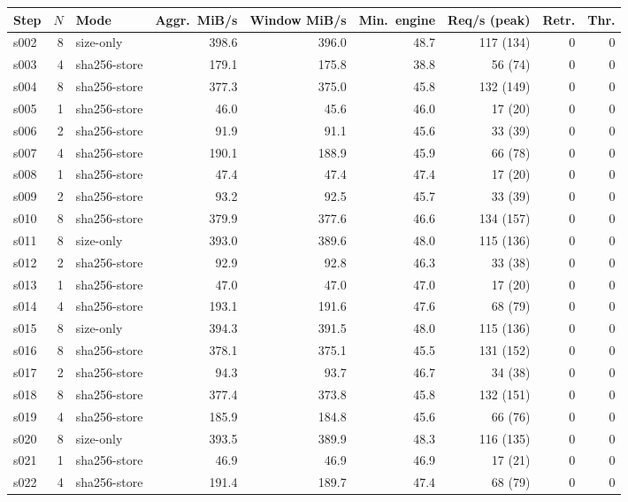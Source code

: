 
\begin{tabular}{@{}lrlrrrrrr@{}}
\toprule
Step & $N$ & Mode & Aggr.\ MiB/s & Window MiB/s & Min.\ engine & Req/s (peak) & Retr. & Thr. \\
\midrule
s002 & 8 & size-only & 398.6 & 396.0 & 48.7 & 117 (134) & 0 & 0 \\
s003 & 4 & sha256-store & 179.1 & 175.8 & 38.8 & 56 (74) & 0 & 0 \\
s004 & 8 & sha256-store & 377.3 & 375.0 & 45.8 & 132 (149) & 0 & 0 \\
s005 & 1 & sha256-store & 46.0 & 45.6 & 46.0 & 17 (20) & 0 & 0 \\
s006 & 2 & sha256-store & 91.9 & 91.1 & 45.6 & 33 (39) & 0 & 0 \\
s007 & 4 & sha256-store & 190.1 & 188.9 & 45.9 & 66 (78) & 0 & 0 \\
s008 & 1 & sha256-store & 47.4 & 47.4 & 47.4 & 17 (20) & 0 & 0 \\
s009 & 2 & sha256-store & 93.2 & 92.5 & 45.7 & 33 (39) & 0 & 0 \\
s010 & 8 & sha256-store & 379.9 & 377.6 & 46.6 & 134 (157) & 0 & 0 \\
s011 & 8 & size-only & 393.0 & 389.6 & 48.0 & 115 (136) & 0 & 0 \\
s012 & 2 & sha256-store & 92.9 & 92.8 & 46.3 & 33 (38) & 0 & 0 \\
s013 & 1 & sha256-store & 47.0 & 47.0 & 47.0 & 17 (20) & 0 & 0 \\
s014 & 4 & sha256-store & 193.1 & 191.6 & 47.6 & 68 (79) & 0 & 0 \\
s015 & 8 & size-only & 394.3 & 391.5 & 48.0 & 115 (136) & 0 & 0 \\
s016 & 8 & sha256-store & 378.1 & 375.1 & 45.5 & 131 (152) & 0 & 0 \\
s017 & 2 & sha256-store & 94.3 & 93.7 & 46.7 & 34 (38) & 0 & 0 \\
s018 & 8 & sha256-store & 377.4 & 373.8 & 45.8 & 132 (151) & 0 & 0 \\
s019 & 4 & sha256-store & 185.9 & 184.8 & 45.6 & 66 (76) & 0 & 0 \\
s020 & 8 & size-only & 393.5 & 389.9 & 48.3 & 116 (135) & 0 & 0 \\
s021 & 1 & sha256-store & 46.9 & 46.9 & 46.9 & 17 (21) & 0 & 0 \\
s022 & 4 & sha256-store & 191.4 & 189.7 & 47.4 & 68 (79) & 0 & 0 \\

\end{tabular}
